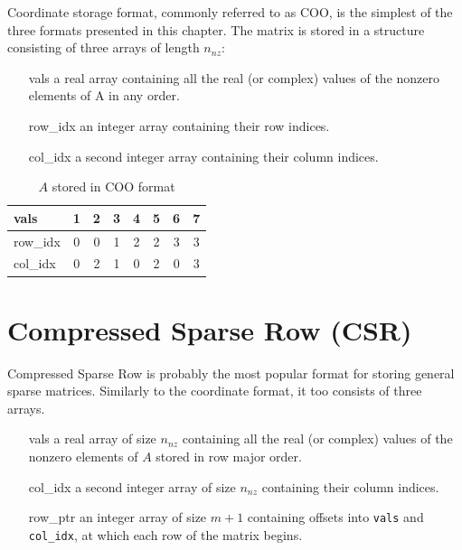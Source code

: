 \documentclass[thesis=M,english]{FITthesis}[2019/12/23]
\begin{document}
Coordinate storage format, commonly referred to as COO, is the simplest of the three formats presented in this
chapter. The matrix is stored in a  structure consisting of three arrays of length $n_{nz}$\cite{saad03:IMS}:

\begin{enumerate}
    \itemsep=0em
    \item[vals] a real array containing all the real (or complex) values of the nonzero elements of A in any order.
    \item[row\_idx] an integer array containing their row indices.
    \item[col\_idx] a second integer array containing their column indices.
\end{enumerate}

\begin{table}[h!]
    \centering
    \begin{tabular}{ |l||c|c|c|c|c|c|c| }
        \hline
        vals     & 1 & 2 & 3 & 4 & 5 & 6 & 7 \\
        \hline
        row\_idx & 0 & 0 & 1 & 2 & 2 & 3 & 3 \\
        \hline
        col\_idx & 0 & 2 & 1 & 0 & 2 & 0 & 3 \\
        \hline
    \end{tabular}
    \caption{$A$ stored in COO format}
\end{table}


\section{Compressed Sparse Row (CSR)}\label{smsf:csr}

Compressed Sparse Row is probably the most popular format for storing general sparse matrices.
\cite{saad03:IMS} Similarly to the coordinate format, it too consists of three arrays.

\begin{enumerate}
    \itemsep=0em
    \item[vals] a real array of size $n_{nz}$ containing all the real (or complex) values of the nonzero elements of $A$
        stored in row major order.
    \item[col\_idx] a second integer array of size $n_{nz}$ containing their column indices.
    \item[row\_ptr] an integer array of size $m + 1$ containing offsets into \lstinline{vals} and
        \lstinline!col_idx!, at which each row of the matrix begins.
\end{enumerate}
\end{document}
